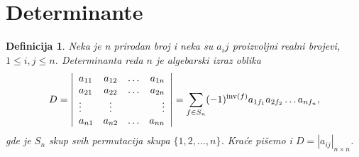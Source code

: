 \documentclass[10pt, a4paper]{article}
\newtheorem{define}{Definicija}
\begin{document}



\section{Determinante}

\begin{define}
    Neka je n prirodan broj i neka su $a_ij$ proizvoljni realni brojevi, $1 \leq i, j \leq n$. 
    Determinanta reda $n$ je algebarski izraz oblika
    \[
        D = \left|
            \begin{array}[]{lccr}
            a_{11} & a_{12} & \ldots & a_{1n} \\
            a_{21} & a_{22} & \ldots & a_{2n} \\
            \vdots & \vdots & & \vdots \\
            a_{n1} & a_{n2} & \ldots & a_{nn}
            \end{array}
            \right| = 
            \sum_{f \in S_n} (-1)^{\mathrm{inv}(f)} a_{1f_1} a_{2f_2} \ldots a_{nf_n},
    \]
    gde je $S_n$ skup svih permutacija skupa $\{1, 2, \ldots, n\}$. Kra\'ce pi\v{s}emo i $D = |a_{ij}|_{n \times n}$.
\end{define}
\end{document}
